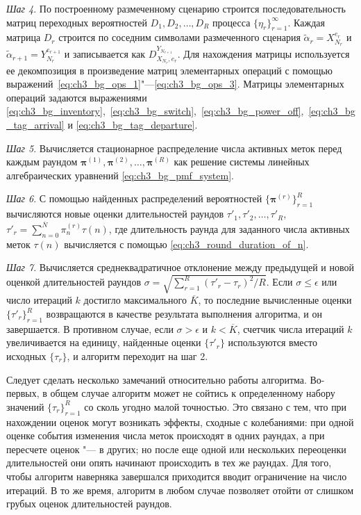 \textit{Шаг 4}. По построенному размеченному сценарию строится последовательность матриц переходных вероятностей $D_1, D_2, \dots, D_R$ процесса $\{ \eta_r \}_{r=1}^\infty$. Каждая матрица $D_r$ строится по соседним символами размеченного сценария $\widetilde{\alpha}_r = X_{N_r}^{e_r}$ и $\widetilde{\alpha}_{r+1} = Y_{N_r}^{e_{r+1}}$ и записывается как $D_{X_{N_r},e_r}^{Y_{N_{r+1}}}$. Для нахождения матрицы используется ее декомпозиция в произведение матриц элементарных операций с помощью выражений~\eqref{eq:ch3_bg_ops_1}"---\eqref{eq:ch3_bg_ops_3}. Матрицы элементарных операций задаются выражениями \eqref{eq:ch3_bg_inventory},~\eqref{eq:ch3_bg_switch},~\eqref{eq:ch3_bg_power_off},~\eqref{eq:ch3_bg_tag_arrival} и \eqref{eq:ch3_bg_tag_departure}.

\textit{Шаг 5}. Вычисляется стационарное распределение числа активных меток перед каждым раундом $\bm{\pi}^{(1)}, \bm{\pi}^{(2)}, \dots, \bm{\pi}^{(R)}$ как решение системы линейных алгебраических уравнений \eqref{eq:ch3_bg_pmf_system}.

\textit{Шаг 6}. С помощью найденных распределений вероятностей $\{ \bm{\pi}^{(r)} \}_{r=1}^R$ вычисляются новые оценки длительностей раундов $\tau'_1, \tau'_2, \dots, \tau'_R$, $\tau'_r = \sum_{n=0}^{\overline{N}} \pi^{(r)}_n \tau(n)$, где длительность раунда для заданного числа активных меток $\tau(n)$ вычисляется с помощью \eqref{eq:ch3_round_duration_of_n}.

\textit{Шаг 7}. Вычисляется среднеквадратичное отклонение между предыдущей и новой оценкой длительностей раундов $\sigma = \sqrt{\sum_{r=1}^R (\tau'_r - \tau_r)^2 / R}$. Если $\sigma \leqslant \epsilon$ или число итераций $k$ достигло максимального $\overline{K}$, то последние вычисленные оценки $\{ \tau'_r \}_{r=1}^R$ возвращаются в качестве результата выполнения алгоритма, и он завершается. В противном случае, если $\sigma > \epsilon$ и $k < \overline{K}$, счетчик числа итераций $k$ увеличивается на единицу, найденные оценки $\{ \tau'_r \}$ используются вместо исходных $\{ \tau_r \}$, и алгоритм переходит на шаг 2.

Следует сделать несколько замечаний относительно работы алгоритма. Во-первых, в общем случае алгоритм может не сойтись к определенному набору значений $\{ \tau_r \}_{r=1}^R$ со сколь угодно малой точностью. Это связано с тем, что при нахождении оценок могут возникать эффекты, сходные с колебаниями: при одной оценке события изменения числа меток происходят в одних раундах, а при пересчете оценок "--- в других; но после еще одной или нескольких переоценки длительностей они опять начинают происходить в тех же раундах. Для того, чтобы алгоритм наверняка завершался приходится вводит ограничение на число итераций. В то же время, алгоритм в любом случае позволяет отойти от слишком грубых оценок длительностей раундов.

